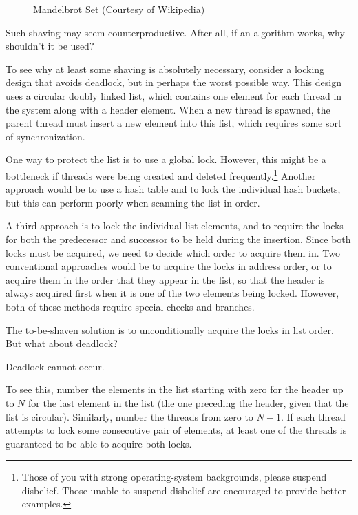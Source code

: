\begin{figure}
\centering
{}
\caption{Mandelbrot Set (Courtesy of Wikipedia)}
\label{fig:easy:Mandelbrot Set}
\end{figure}

Such shaving may seem counterproductive.
After all, if an algorithm works, why shouldn't it be used?

To see why at least some shaving is absolutely necessary, consider
a locking design that avoids deadlock, but in perhaps the worst possible way.
This design uses a circular doubly linked list, which contains one
element for each thread in the system along with a header element.
When a new thread is spawned, the parent thread must insert a new
element into this list, which requires some sort of synchronization.

One way to protect the list is to use a global lock.
However, this might be a bottleneck if threads were being created and
deleted frequently.\footnote{
	Those of you with strong operating-system backgrounds, please
	suspend disbelief.
	Those unable to suspend disbelief are encouraged to provide
	better examples.}
Another approach would be to use a hash table and to lock the individual
hash buckets, but this can perform poorly when scanning the list in order.

A third approach is to lock the individual list elements, and to require
the locks for both the predecessor and successor to be held during the
insertion.
Since both locks must be acquired, we need to decide which order to
acquire them in.
Two conventional approaches would be to acquire the locks in address
order, or to acquire them in the order that they appear in the list,
so that the header is always acquired first when it is one of the two
elements being locked.
However, both of these methods require special checks and branches.

The to-be-shaven solution is to unconditionally acquire the locks in
list order.
But what about deadlock?

Deadlock cannot occur.

To see this, number the elements in the list starting with zero for the
header up to $N$ for the last element in the list (the one preceding the
header, given that the list is circular).
Similarly, number the threads from zero to $N-1$.
If each thread attempts to lock some consecutive pair of elements,
at least one of the threads is guaranteed to be able to acquire both
locks.

